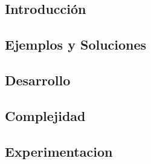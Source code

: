 \subsection{Introducci\'on} 

\subsection{Ejemplos y Soluciones}

\subsection{Desarrollo}

\subsection{Complejidad}

\subsection{Experimentacion}
